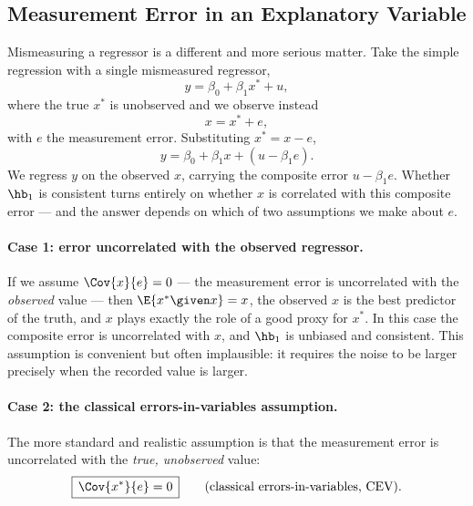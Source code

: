 \subsection{Measurement Error in an Explanatory Variable}

Mismeasuring a regressor is a different and more serious matter. Take the simple regression with a single mismeasured regressor,
\[
y = \beta_0 + \beta_1 x^* + u,
\]
where the true $x^*$ is unobserved and we observe instead
\[
x = x^* + e,
\]
with $e$ the measurement error. Substituting $x^* = x - e$,
\[
y = \beta_0 + \beta_1 x + (u - \beta_1 e).
\]
We regress $y$ on the observed $x$, carrying the composite error $u - \beta_1 e$. Whether $\hb_1$ is consistent turns entirely on whether $x$ is correlated with this composite error --- and the answer depends on which of two assumptions we make about $e$.

\paragraph{Case 1: error uncorrelated with the observed regressor.}
If we assume $\Cov{x}{e}=0$ --- the measurement error is uncorrelated with the \emph{observed} value --- then $\E{x^* \given x}=x$, the observed $x$ is the best predictor of the truth, and $x$ plays exactly the role of a good proxy for $x^*$. In this case the composite error is uncorrelated with $x$, and $\hb_1$ is unbiased and consistent. This assumption is convenient but often implausible: it requires the noise to be larger precisely when the recorded value is larger.

\paragraph{Case 2: the classical errors-in-variables assumption.}
The more standard and realistic assumption is that the measurement error is uncorrelated with the \emph{true, unobserved} value:
\[
\boxed{\,\Cov{x^*}{e} = 0\,} \qquad \text{(classical errors-in-variables, CEV).}
\]


